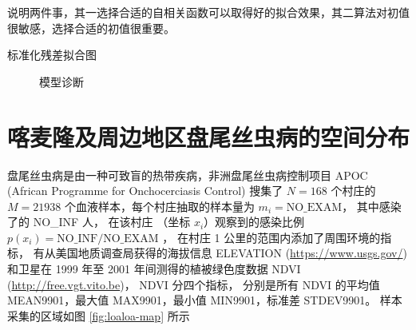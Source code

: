 \documentclass[12pt,a4paper,UTF8,twoside]{book}
\theoremstyle{definition}
\theoremstyle{definition}
\theoremstyle{definition}
\theoremstyle{remark}
\begin{document}
说明两件事，其一选择合适的自相关函数可以取得好的拟合效果，其二算法对初值很敏感，选择合适的初值很重要。

标准化残差拟合图

\begin{figure}

{\centering {}

}

\caption{模型诊断}\label{fig:model-check}
\end{figure}

\hypertarget{case-loaloa}{%
\section{喀麦隆及周边地区盘尾丝虫病的空间分布}\label{case-loaloa}}

盘尾丝虫病是由一种可致盲的热带疾病，非洲盘尾丝虫病控制项目 APOC (African
Programme for Onchocerciasis Control) 搜集了 \(N=168\) 个村庄的
\(M = 21938\) 个血液样本，每个村庄抽取的样本量为
\(m_i=\mathrm{NO\_EXAM}\)， 其中感染了的 NO\_INF 人， 在该村庄 （坐标
\(x_i\)）观察到的感染比例 \(p(x_i) = \mathrm{NO\_INF/NO\_EXAM}\) ，
在村庄 1 公里的范围内添加了周围环境的指标，
有从美国地质调查局获得的海拔信息 ELEVATION (\url{https://www.usgs.gov/})
和卫星在 1999 年至 2001 年间测得的植被绿色度数据 NDVI
(\url{http://free.vgt.vito.be})， NDVI 分四个指标， 分别是所有 NDVI
的平均值 MEAN9901，最大值 MAX9901，最小值 MIN9901，标准差 STDEV9901。
样本采集的区域如图 \ref{fig:loaloa-map} 所示
\end{document}

